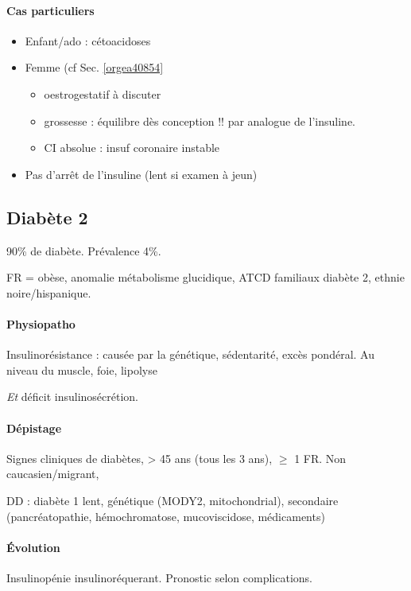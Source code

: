 \documentclass{book}
\begin{document}
\paragraph{Cas particuliers}
\label{sec:org70a5379}
\begin{itemize}
\item Enfant/ado : \danger cétoacidoses
\item Femme (cf Sec. \ref{orgea40854}
\begin{itemize}
\item oestrogestatif à discuter
\item grossesse : équilibre dès conception !! par analogue de l'insuline.
\item CI absolue : insuf coronaire instable
\end{itemize}
\item Pas d'arrêt de l'insuline (lent si examen à jeun)
\end{itemize}

\subsection{Diabète 2}
\label{sec:org6b53789}
90\% de diabète. Prévalence 4\%. 

FR = obèse, anomalie métabolisme glucidique, ATCD familiaux diabète 2, ethnie noire/hispanique.

\paragraph{Physiopatho}
\label{sec:org3a704c8}
Insulinorésistance : causée par la génétique, sédentarité, excès pondéral. Au niveau du muscle, foie, lipolyse

\emph{Et} déficit insulinosécrétion. 

\paragraph{Dépistage}
\label{sec:orga72ecd7}
Signes cliniques de diabètes, > 45 ans (tous les 3 ans), \(\ge\) 1 FR. 
 Non caucasien/migrant, 

DD : diabète 1 lent, génétique (MODY2, mitochondrial), secondaire (pancréatopathie, hémochromatose,
mucoviscidose, médicaments)

\paragraph{Évolution}
\label{sec:org3d7b5ac}
Insulinopénie \thus insulinoréquerant. Pronostic selon complications.
\end{document}
